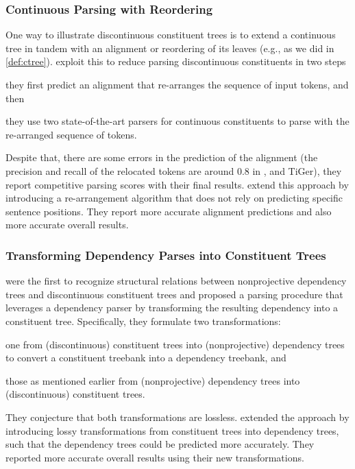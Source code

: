 \documentclass[../document.tex]{subfiles}
\begin{document}
    \subsubsection*{Continuous Parsing with Reordering}
    One way to illustrate discontinuous constituent trees is to extend a continuous tree in tandem with an alignment or reordering of its leaves (e.g.\@,  as we did in \cref{def:ctree}).
    \citet{FerGon21a} exploit this to reduce parsing discontinuous constituents in two steps
    \begin{inparaenum}[]
        \item they first predict an alignment that re-arranges the sequence of input tokens, and then
        \item they use two state-of-the-art parsers for continuous constituents to parse with the re-arranged sequence of tokens.
    \end{inparaenum}
    Despite that, there are some errors in the prediction of the alignment (the precision and recall of the relocated tokens are around $0.8$ in ,  and TiGer), they report competitive parsing scores with their final results.
    \citet{Sun22} extend this approach by introducing a re-arrangement algorithm that does not rely on predicting specific sentence positions.
    They report more accurate alignment predictions and also more accurate overall results.

    \subsubsection*{Transforming Dependency Parses into Constituent Trees}
    \citet{Hall08} were the first to recognize structural relations between nonprojective dependency trees and discontinuous constituent trees and proposed a parsing procedure that leverages a dependency parser by transforming the resulting dependency into a constituent tree.
    Specifically, they formulate two transformations:
    \begin{inparaenum}[]
        \item one from (discontinuous) constituent trees into (nonprojective) dependency trees to convert a constituent treebank into a dependency treebank, and
        \item those as mentioned earlier from (nonprojective) dependency trees into (discontinuous) constituent trees.
    \end{inparaenum}
    They conjecture that both transformations are lossless.
    \citet{Ferandez15} extended the approach by introducing lossy transformations from constituent trees into dependency trees, such that the dependency trees could be predicted more accurately.
    They reported more accurate overall results using their new transformations.
\end{document}
